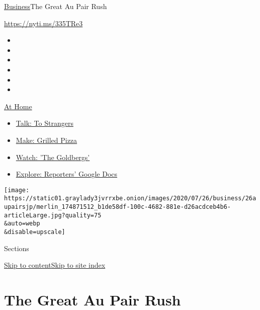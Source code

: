 \href{/section/business}{Business}\textbar{}The Great Au Pair Rush

\url{https://nyti.ms/335TRe3}

\begin{itemize}
\item
\item
\item
\item
\item
\item
\end{itemize}

\href{https://www.nytimes3xbfgragh.onion/spotlight/at-home?action=click\&pgtype=Article\&state=default\&region=TOP_BANNER\&context=at_home_menu}{At
Home}

\begin{itemize}
\tightlist
\item
  \href{https://www.nytimes3xbfgragh.onion/2020/08/03/well/family/the-benefits-of-talking-to-strangers.html?action=click\&pgtype=Article\&state=default\&region=TOP_BANNER\&context=at_home_menu}{Talk:
  To Strangers}
\item
  \href{https://www.nytimes3xbfgragh.onion/2020/08/01/at-home/coronavirus-make-pizza-on-a-grill.html?action=click\&pgtype=Article\&state=default\&region=TOP_BANNER\&context=at_home_menu}{Make:
  Grilled Pizza}
\item
  \href{https://www.nytimes3xbfgragh.onion/2020/07/31/arts/television/goldbergs-abc-stream.html?action=click\&pgtype=Article\&state=default\&region=TOP_BANNER\&context=at_home_menu}{Watch:
  'The Goldbergs'}
\item
  \href{https://www.nytimes3xbfgragh.onion/interactive/2020/at-home/even-more-reporters-editors-diaries-lists-recommendations.html?action=click\&pgtype=Article\&state=default\&region=TOP_BANNER\&context=at_home_menu}{Explore:
  Reporters' Google Docs}
\end{itemize}

\texttt{[image: https://static01.graylady3jvrrxbe.onion/images/2020/07/26/business/26aupairsjp/merlin\_174871512\_b1de58df-100c-4682-881e-d26acdceb4b6-articleLarge.jpg?quality=75\\\&auto=webp\\\&disable=upscale]}

Sections

\protect\hyperlink{site-content}{Skip to
content}\protect\hyperlink{site-index}{Skip to site index}

\hypertarget{the-great-au-pair-rush}{%
\section{The Great Au Pair Rush}\label{the-great-au-pair-rush}}

